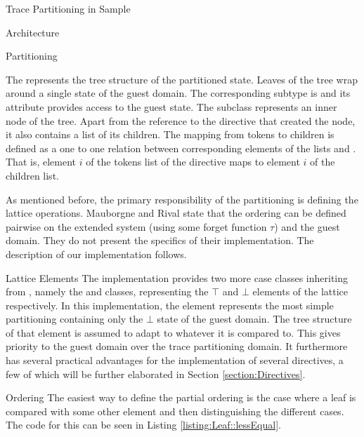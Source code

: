 \begin{chapter}{Trace Partitioning in Sample}
\begin{section}{Architecture}

		\begin{subsection}{Partitioning}
			\label{subsection:Partitioning}

			The  represents the tree structure of the partitioned state. Leaves of the tree wrap around a single state of the guest domain. The corresponding subtype is  and its  attribute provides access to the guest state. The  subclass represents an inner node of the tree. Apart from the reference to the directive that created the node, it also contains a list of its children. The mapping from tokens to children is defined as a one to one relation between corresponding elements of the lists  and . That is, element $i$ of the tokens list of the directive maps to element $i$ of the children list. 

			As mentioned before, the primary responsibility of the partitioning is defining the lattice operations. Mauborgne and Rival state that the ordering can be defined pairwise on the extended system (using some forget function $\tau$) and the guest domain. They do not present the specifics of their implementation. The description of our implementation follows.


			\begin{subsubsection}{Lattice Elements}
				The implementation provides two more case classes inheriting from , namely the  and  classes, representing the $\top$ and $\bot$ elements of the lattice respectively. In this implementation, the  element represents the most simple partitioning containing only the $\bot$ state of the guest domain. The tree structure of that element is assumed to adapt to whatever it is compared to. This gives priority to the guest domain over the trace partitioning domain. It furthermore has several practical advantages for the implementation of several directives, a few of which will be further elaborated in Section \ref{section:Directives}.
			\end{subsubsection}


			\begin{subsubsection}{Ordering}
				The easiest way to define the partial ordering is the case where a leaf is compared with some other element and then distinguishing the different cases. The code for this can be seen in Listing \ref{listing:Leaf::lessEqual}. 


\end{subsubsection}
\end{subsection}
\end{section}
\end{chapter}
